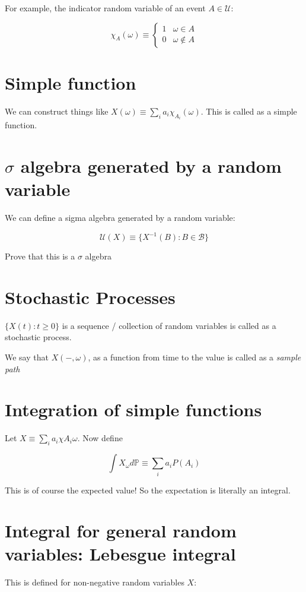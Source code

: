 \documentclass{book}
\renewcommand{\P}{\ensuremath{\mathbb{P}}}
\newcommand{\B}{\ensuremath{\mathscr{B}}}
\newcommand{\U}{\ensuremath{\mathscr{U}}}
\theoremstyle{definition}
\begin{document}
For example, the indicator random variable of an event $A \in \U$:

$$
\chi_A (\omega) \equiv
\begin{cases}
1 & \omega \in A \\
0 & \omega \not \in A
\end{cases}
$$

\section{Simple function}
We can construct things like $X(\omega) \equiv \sum_i a_i \chi_{A_i}(\omega)$.
This is called as a simple function.

\section{$\sigma$ algebra generated by a random variable}
We can define a sigma algebra generated by a random variable:

$$
\U(X) \equiv \{ X^{-1}(B): B \in \B \}
$$

Prove that this is a $\sigma$ algebra

\section{Stochastic Processes}

$\{ X(t) : t \geq 0 \}$ is a sequence / collection of random variables is
called as a stochastic process. 

We say that $X(-, \omega)$, as a function from time to the value is called as a
\emph{sample path}


\section{Integration of simple functions}

Let $X \equiv \sum_i a_i \chi{A_i} \omega$. Now define

$$
\int X_{\omega} d\P \equiv \sum_i a_i P(A_i)
$$

This is of course the expected value! So the expectation is literally an integral.


\section{Integral for general random variables: Lebesgue integral}

This is defined for non-negative random variables $X$:
\end{document}
